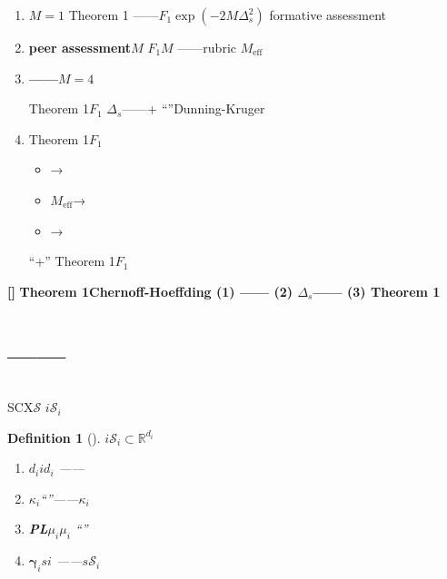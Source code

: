 \documentclass[11pt,a4paper]{article}
\newtheorem{definition}[theorem]{Definition}
\theoremstyle{remark}
\newcommand{\R}{\mathbb{R}}
\newcommand{\Sstates}{\mathcal{S}}
\newcommand{\rigorous}{\textnormal{\textbf{[]}}}
\begin{document}
\begin{enumerate}[label=(\arabic*)]
    \item \textbf{}$M=1$
          Theorem 1\textbf{}
          ——$F_1$$\exp(-2M\Delta_s^2)$
          formative assessment
    \item \textbf{peer assessment}$M$
          $F_1$$M$
          ——rubric
          $M_{\text{eff}}$
    \item \textbf{——}$M=4$
          
          
          Theorem 1$F_1$
          $\Delta_s$——+
          ``''Dunning-Kruger
    \item \textbf{}Theorem 1$F_1$
          \textbf{}
          \begin{itemize}
              \item \textbf{}→ 
              \item \textbf{}$M_{\text{eff}}$→ 
              \item \textbf{}→ 
          \end{itemize}
          ``+''
          Theorem 1$F_1$
\end{enumerate}

\rigorous{} \textbf{Theorem 1Chernoff-Hoeffding
(1) ——
(2) $\Delta_s$——
(3) 
Theorem 1}

\section{——}

\subsection{}

SCX\textbf{}$\Sstates$
$i$\textbf{}$\Sstates_i$

\begin{definition}[]
\label{def:individual_space}
$i$$\Sstates_i \subset \R^{d_i}$
\begin{enumerate}[label=(\arabic*)]
    \item \textbf{$d_i$}$i$$d_i$
          ——
    \item \textbf{$\kappa_i$}``''——$\kappa_i$
          
    \item \textbf{PL$\mu_i$}$\mu_i$
          ``''
    \item \textbf{$\boldsymbol{\gamma}_i$}$s$$i$
          ——$s$$\Sstates_i$
\end{enumerate}
\end{definition}
\end{document}
